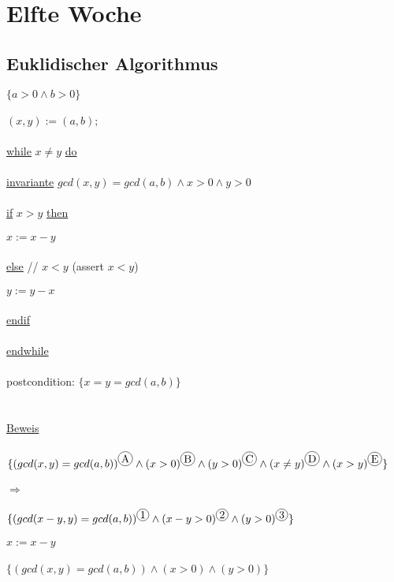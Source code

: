 \documentclass[18pt,a4paper]{article}
\newcommand*\circled[1]{\tikz[baseline=(char.base)]{
            \node[shape=circle,draw,inner sep=1pt] (char) {#1};}}
\newcommand{\tab}{\hspace*{2em}}
\begin{document}
\section{Elfte Woche}

\subsection{Euklidischer Algorithmus}

$\{a>0 \wedge b>0\}$\\
\\
$(x,y) := (a,b);$\\
\\
\uline{while} $x\neq y$ \uline{do}\\
\\
\tab \uline{invariante} $gcd(x,y) = gcd(a,b) \wedge x>0 \wedge y>0$\\
\\
\uline{if} $x>y$ \uline{then}\\
\\
\tab $x:= x-y$\\
\\
\uline{else} \tab// $x<y$ (assert $x<y$)\\
\\
\tab $y := y-x$\\
\\
\uline{endif}\\
\\
\uline{endwhile}\\
\\
postcondition: $\{ x = y = gcd(a,b)\}$\\
\\
\\
\uline{Beweis}\\
\\
$\{ (gcd(x,y) = gcd(a,b))^{\circled{A}} \wedge (x>0)^{\circled{B}} \wedge (y>0)^{\circled{C}} \wedge (x\neq y)^{\circled{D}} \wedge (x> y)^{\circled{E}} \}$\\
\\
$\Rightarrow$\\
\\
$\{ (gcd(x-y,y) = gcd(a,b))^{\circled{1}} \wedge (x-y>0)^{\circled{2}} \wedge (y>0)^{\circled{3}} \}$\\
\\
$x := x-y$\\
\\
$\{ (gcd(x,y) = gcd(a,b)) \wedge (x>0) \wedge (y>0)\}$\\
\\
\end{document}

